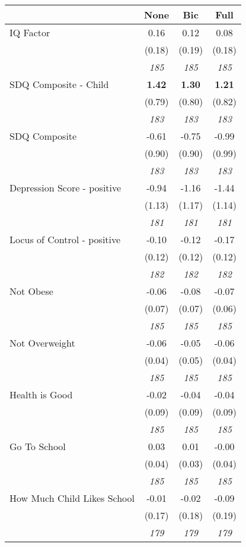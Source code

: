 \begin{tabular}{l c c c}
\toprule
 & None & Bic & Full \\
\midrule
IQ Factor & 0.16 & 0.12 & 0.08 \\
& (0.18) & (0.19) & (0.18) \\
& \textit{ 185 } & \textit{ 185 } & \textit{ 185 } \\
SDQ Composite - Child & \textbf{ 1.42 } & \textbf{ 1.30 } & \textbf{ 1.21 } \\
& (0.79) & (0.80) & (0.82) \\
& \textit{ 183 } & \textit{ 183 } & \textit{ 183 } \\
SDQ Composite & -0.61 & -0.75 & -0.99 \\
& (0.90) & (0.90) & (0.99) \\
& \textit{ 183 } & \textit{ 183 } & \textit{ 183 } \\
Depression Score - positive & -0.94 & -1.16 & -1.44 \\
& (1.13) & (1.17) & (1.14) \\
& \textit{ 181 } & \textit{ 181 } & \textit{ 181 } \\
Locus of Control - positive & -0.10 & -0.12 & -0.17 \\
& (0.12) & (0.12) & (0.12) \\
& \textit{ 182 } & \textit{ 182 } & \textit{ 182 } \\
Not Obese & -0.06 & -0.08 & -0.07 \\
& (0.07) & (0.07) & (0.06) \\
& \textit{ 185 } & \textit{ 185 } & \textit{ 185 } \\
Not Overweight & -0.06 & -0.05 & -0.06 \\
& (0.04) & (0.05) & (0.04) \\
& \textit{ 185 } & \textit{ 185 } & \textit{ 185 } \\
Health is Good & -0.02 & -0.04 & -0.04 \\
& (0.09) & (0.09) & (0.09) \\
& \textit{ 185 } & \textit{ 185 } & \textit{ 185 } \\
Go To School & 0.03 & 0.01 & -0.00 \\
& (0.04) & (0.03) & (0.04) \\
& \textit{ 185 } & \textit{ 185 } & \textit{ 185 } \\
How Much Child Likes School & -0.01 & -0.02 & -0.09 \\
& (0.17) & (0.18) & (0.19) \\
& \textit{ 179 } & \textit{ 179 } & \textit{ 179 } \\

\end{tabular}
